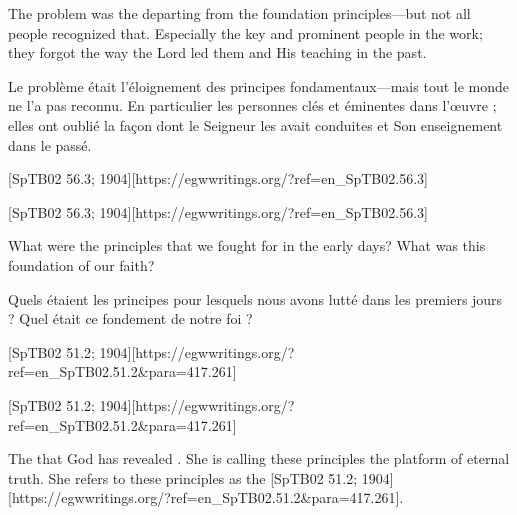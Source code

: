 The problem was the departing from the foundation principles—but not all people recognized that. Especially the key and prominent people in the work; they forgot the way the Lord led them and His teaching in the past.


Le problème était l'éloignement des principes fondamentaux—mais tout le monde ne l'a pas reconnu. En particulier les personnes clés et éminentes dans l'œuvre ; elles ont oublié la façon dont le Seigneur les avait conduites et Son enseignement dans le passé.


[SpTB02 56.3; 1904][https://egwwritings.org/?ref=en\_SpTB02.56.3]


[SpTB02 56.3; 1904][https://egwwritings.org/?ref=en\_SpTB02.56.3]


What were the principles that we fought for in the early days? What was this foundation of our faith?


Quels étaient les principes pour lesquels nous avons lutté dans les premiers jours ? Quel était ce fondement de notre foi ?


[SpTB02 51.2; 1904][https://egwwritings.org/?ref=en\_SpTB02.51.2&para=417.261]


[SpTB02 51.2; 1904][https://egwwritings.org/?ref=en\_SpTB02.51.2&para=417.261]


The  that God has revealed . She is calling these principles the platform of eternal truth. She refers to these principles as the [SpTB02 51.2; 1904][https://egwwritings.org/?ref=en\_SpTB02.51.2&para=417.261].


